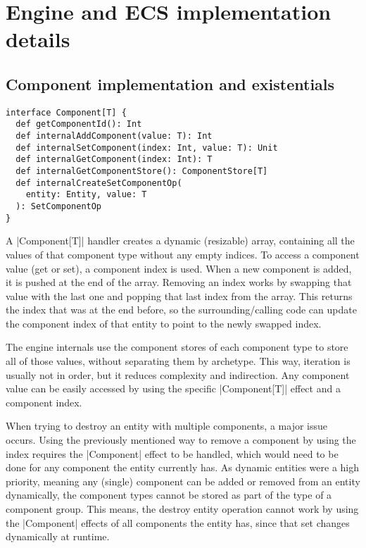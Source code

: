 \chapter{Engine and ECS implementation details}\label{chap:details}

\section{Component implementation and existentials}

\begin{lstlisting}[caption=Component signiture]
interface Component[T] {
  def getComponentId(): Int
  def internalAddComponent(value: T): Int
  def internalSetComponent(index: Int, value: T): Unit
  def internalGetComponent(index: Int): T
  def internalGetComponentStore(): ComponentStore[T]
  def internalCreateSetComponentOp(
    entity: Entity, value: T
  ): SetComponentOp
}
\end{lstlisting}

A |Component[T]| handler creates a dynamic (resizable) array, containing all the values of that component type without any empty indices. To access a component value (get or set), a component index is used. When a new component is added, it is pushed at the end of the array. Removing an index works by swapping that value with the last one and popping that last index from the array. This returns the index that was at the end before, so the surrounding/calling code can update the component index of that entity to point to the newly swapped index.

The engine internals use the component stores of each component type to store all of those values, without separating them by archetype. This way, iteration is usually not in order, but it reduces complexity and indirection. Any component value can be easily accessed by using the specific |Component[T]| effect and a component index.

When trying to destroy an entity with multiple components, a major issue occurs. Using the previously mentioned way to remove a component by using the index requires the |Component| effect to be handled, which would need to be done for any component the entity currently has. As dynamic entities were a high priority, meaning any (single) component can be added or removed from an entity dynamically, the component types cannot be stored as part of the type of a component group. This means, the destroy entity operation cannot work by using the |Component| effects of all components the entity has, since that set changes dynamically at runtime.

